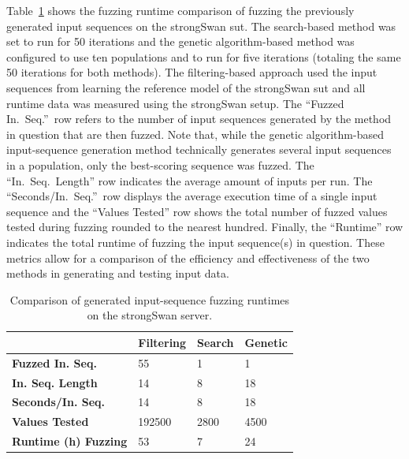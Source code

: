Table~\ref{tab:compfuzz} shows the fuzzing runtime comparison of fuzzing the previously generated input sequences on the strongSwan \ac{sut}. The search-based method was set to run for 50 iterations and the genetic algorithm-based method was configured to use ten populations and to run for five iterations (totaling the same 50 iterations for both methods). The filtering-based approach used the input sequences from learning the reference model of the strongSwan \ac{sut} and all runtime data was measured using the strongSwan setup. The ``Fuzzed In.~Seq.''~row refers to the number of input sequences generated by the method in question that are then fuzzed. Note that, while the genetic algorithm-based input-sequence generation method technically generates several input sequences in a population, only the best-scoring sequence was fuzzed. The ``In.~Seq.~Length'' row indicates the average amount of inputs per run. The ``Seconds/In.~Seq.''~row displays the average execution time of a single input sequence and the ``Values Tested'' row shows the total number of fuzzed values tested during fuzzing rounded to the nearest hundred. Finally, the ``Runtime'' row indicates the total runtime of fuzzing the input sequence(s) in question. These metrics allow for a comparison of the efficiency and effectiveness of the two methods in generating and testing input data.


\begin{table}[H]
	\centering
	\begin{tabular}{|l|l|l|l|}
		\hline
		\rowcolor[HTML]{EFEFEF} 
		& \textbf{Filtering}					& \textbf{Search} 			& \textbf{Genetic}  \\ \hline
		\textbf{Fuzzed In. Seq.}            	& 55                 					& 1                			& 1					\\ \hline
		\textbf{In. Seq. Length}				& 14                					& 8               			& 18		  		\\ \hline
		\textbf{Seconds/In. Seq.}     			& 14                					& 8                			& 18				\\ \hline
		\textbf{Values Tested}     				& 192500              					& 2800		    			& 4500				\\ \hline
		\textbf{Runtime (h) Fuzzing}       		& 53          	 						& 7          				& 24				\\ \hline
	\end{tabular}
	\caption{Comparison of generated input-sequence fuzzing runtimes on the strongSwan server.}
	\label{tab:compfuzz}
\end{table}

